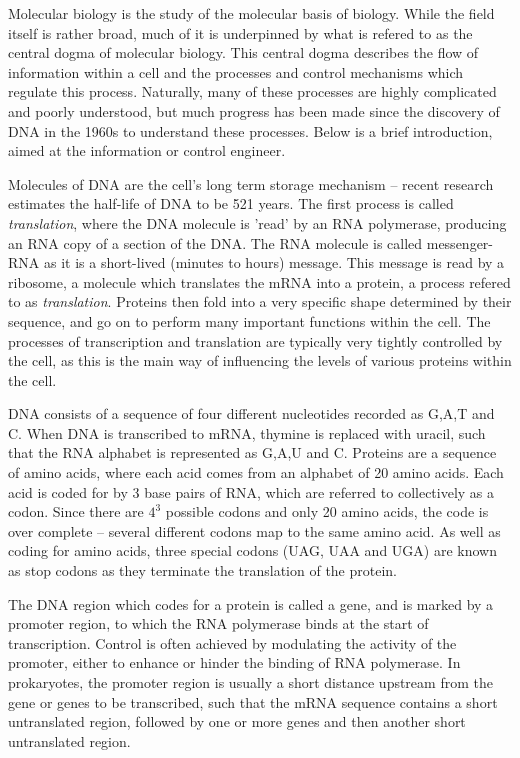 \documentclass[twoside,a4paper]{article}
\begin{document}
\begin{multicols}{2}
Molecular biology is the study of the molecular basis of biology.
While the field itself is rather broad, much of it is underpinned by what is
refered to as the central dogma of molecular biology.
This central dogma describes the flow of information within a cell and the
processes and control mechanisms which regulate this process.
Naturally, many of these processes are highly complicated and poorly
understood, but much progress has been made since the discovery of DNA in the
1960s to understand these processes.
Below is a brief introduction, aimed at the information or control engineer.

Molecules of DNA are the cell's long term storage mechanism -- recent research
estimates the half-life of DNA to be 521 years\cite{DNAhalflife}.
The first process is called \textit{translation}, where the DNA molecule is
'read' by an RNA polymerase, producing an RNA copy of a section of the DNA.
The RNA molecule is called messenger-RNA as it is a short-lived (minutes to
hours) message.
This message is read by a ribosome, a molecule which translates the mRNA into a
protein, a process refered to as \textit{translation}.
Proteins then fold into a very specific shape determined by their 
sequence, and go on to perform many important functions within the cell.
The processes of transcription and translation are typically very tightly
controlled by the cell, as this is the main way of influencing the levels of
various proteins within the cell.

DNA consists of a sequence of four different nucleotides recorded as G,A,T and C.
When DNA is transcribed to mRNA, thymine is replaced with uracil, such that the
RNA alphabet is represented as G,A,U and C.
Proteins are a sequence of amino acids, where each acid comes from an alphabet
of 20 amino acids.
Each acid is coded for by 3 base pairs of RNA, which are referred to
collectively as a codon.
Since there are $4^3$ possible codons and only 20 amino acids, the code is
over complete -- several different codons map to the same amino acid.
As well as coding for amino acids, three special codons (UAG, UAA and UGA) are
known as stop codons as they terminate the translation of the protein.

The DNA region which codes for a protein is called a gene, and is marked by a
promoter region, to which the RNA polymerase binds at the start of
transcription.
Control is often achieved by modulating the activity of the promoter, either to
enhance or hinder the binding of RNA polymerase.
In prokaryotes, the promoter region is usually a short distance upstream from
the gene or genes to be transcribed, such that the mRNA sequence contains a
short untranslated region, followed by one or more genes and then another short
untranslated region.


\end{multicols}
\end{document}
